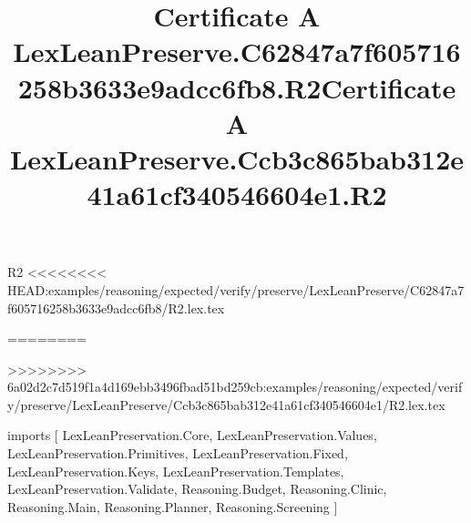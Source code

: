 \begin{lexlean}{R2}
<<<<<<<< HEAD:examples/reasoning/expected/verify/preserve/LexLeanPreserve/C62847a7f605716258b3633e9adcc6fb8/R2.lex.tex
\title{Certificate A LexLeanPreserve.C62847a7f605716258b3633e9adcc6fb8.R2}
========
\title{Certificate A LexLeanPreserve.Ccb3c865bab312e41a61cf340546604e1.R2}
>>>>>>>> 6a02d2c7d519f1a4d169ebb3496fbad51bd259cb:examples/reasoning/expected/verify/preserve/LexLeanPreserve/Ccb3c865bab312e41a61cf340546604e1/R2.lex.tex
\begin{coremodule}
imports [
  LexLeanPreservation.Core,
  LexLeanPreservation.Values,
  LexLeanPreservation.Primitives,
  LexLeanPreservation.Fixed,
  LexLeanPreservation.Keys,
  LexLeanPreservation.Templates,
  LexLeanPreservation.Validate,
  Reasoning.Budget,
  Reasoning.Clinic,
  Reasoning.Main,
  Reasoning.Planner,
  Reasoning.Screening
]


\end{coremodule}
\end{lexlean}
